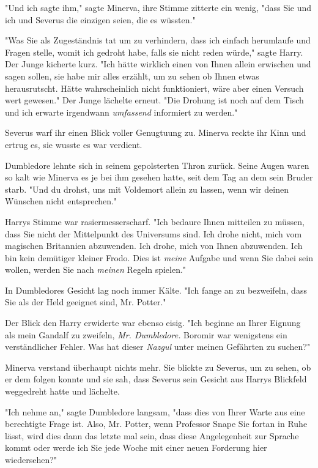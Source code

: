 {"Und ich sagte ihm," sagte Minerva, ihre Stimme zitterte ein wenig, "dass Sie und ich und Severus die einzigen seien, die es wüssten."

"Was Sie als Zugeständnis tat um zu verhindern, dass ich einfach herumlaufe und Fragen stelle, womit ich gedroht habe, falls sie nicht reden würde," sagte Harry. Der Junge kicherte kurz. "Ich hätte wirklich einen von Ihnen allein erwischen und sagen sollen, sie habe mir alles erzählt, um zu sehen ob Ihnen etwas herausrutscht. Hätte wahrscheinlich nicht funktioniert, wäre aber einen Versuch wert gewesen." Der Junge lächelte erneut. "Die Drohung ist noch auf dem Tisch und ich erwarte irgendwann \emph{umfassend} informiert zu werden."

Severus warf ihr einen Blick voller Genugtuung zu. Minerva reckte ihr Kinn und ertrug es, sie wusste es war verdient.

Dumbledore lehnte sich in seinem gepolsterten Thron zurück. Seine Augen waren so kalt wie Minerva es je bei ihm gesehen hatte, seit dem Tag an dem sein Bruder starb. "Und du drohst, uns mit Voldemort allein zu lassen, wenn wir deinen Wünschen nicht entsprechen."

Harrys Stimme war rasiermesserscharf. "Ich bedaure Ihnen mitteilen zu müssen, dass Sie nicht der Mittelpunkt des Universums sind. Ich drohe nicht, mich vom magischen Britannien abzuwenden. Ich drohe, mich von Ihnen abzuwenden. Ich bin kein demütiger kleiner Frodo. Dies ist \emph{meine} Aufgabe und wenn Sie dabei sein wollen, werden Sie nach \emph{meinen} Regeln spielen."

In Dumbledores Gesicht lag noch immer Kälte. "Ich fange an zu bezweifeln, dass Sie als der Held geeignet sind, Mr. Potter."

Der Blick den Harry erwiderte war ebenso eisig. "Ich beginne an Ihrer Eignung als mein Gandalf zu zweifeln, \emph{Mr. Dumbledore.} Boromir war wenigstens ein verständlicher Fehler. Was hat dieser \emph{Nazgul} unter meinen Gefährten zu suchen?"

Minerva verstand überhaupt nichts mehr. Sie blickte zu Severus, um zu sehen, ob er dem folgen konnte und sie sah, dass Severus sein Gesicht aus Harrys Blickfeld weggedreht hatte und lächelte.

"Ich nehme an," sagte Dumbledore langsam, "dass dies von Ihrer Warte aus eine berechtigte Frage ist. Also, Mr. Potter, wenn Professor Snape Sie fortan in Ruhe lässt, wird dies dann das letzte mal sein, dass diese Angelegenheit zur Sprache kommt oder werde ich Sie jede Woche mit einer neuen Forderung hier wiedersehen?"

}
